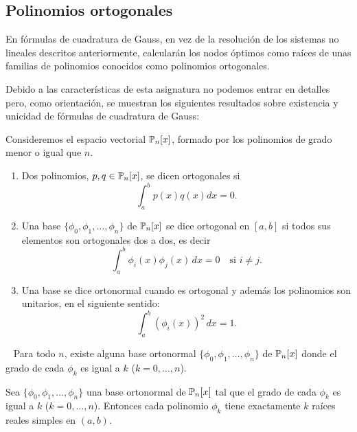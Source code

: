 \subsection*{Polinomios ortogonales}
En fórmulas de cuadratura de Gauss, en vez de la resolución de los
sistemas no lineales descritos anteriormente, calcularán los nodos
óptimos como raíces de unas familias de polinomios conocidos como
polinomios ortogonales.

Debido a las características de esta asignatura no podemos entrar en
detalles pero, como orientación, se muestran los siguientes resultados
sobre existencia y unicidad de fórmulas de cuadratura de Gauss:

\begin{definition}
  \label{def:pol-orgotonales}
  Consideremos el espacio vectorial $\operatorname{{\mathbb P}}_n[x]$, formado por los
  polinomios de grado menor o igual que $n$.

  \begin{enumerate}
    \item Dos polinomios, $p,q\in\operatorname{{\mathbb P}}_n[x]$, se dicen ortogonales si
      \begin{equation*}
      \int_a^b p(x)q(x) dx = 0.
    \end{equation*}
  \item Una base $\{\phi_0,\phi_1,\dots,\phi_n\}$ de $\operatorname{{\mathbb P}}_n[x]$ se
    dice ortogonal en $[a,b]$ si todos sus elementos son ortogonales
    dos a dos, es decir
    \begin{equation*}
      \int_a^b \phi_i(x) \phi_j(x)\, dx = 0 \quad \text{si } i\neq j.
    \end{equation*}
  \item
    Una base se dice ortonormal cuando es ortogonal y además los
    polinomios son unitarios, en el siguiente sentido:
    \begin{equation*}
      \int_a^b (\phi_i(x))^2 \,dx = 1.
    \end{equation*}
  \end{enumerate}
\end{definition}

\begin{proposition}~ Para todo $n$, existe alguna base ortonormal
  $\{\phi_0,\phi_1,\dots,\phi_n\}$ de $\operatorname{{\mathbb P}}_n[x]$ donde el grado de
  cada $\phi_k$ es igual a $k$ ($k=0,\dots,n$).
\end{proposition}

\begin{proposition}
  Sea $\{\phi_0,\phi_1,\dots,\phi_n\}$ una base ortonormal de
  $\operatorname{{\mathbb P}}_n[x]$ tal que el grado de cada $\phi_k$ es igual a $k$
  ($k=0,\dots,n$).  Entonces cada polinomio $\phi_k$ tiene exactamente
  $k$ raíces reales simples en $(a,b)$.
\end{proposition}

